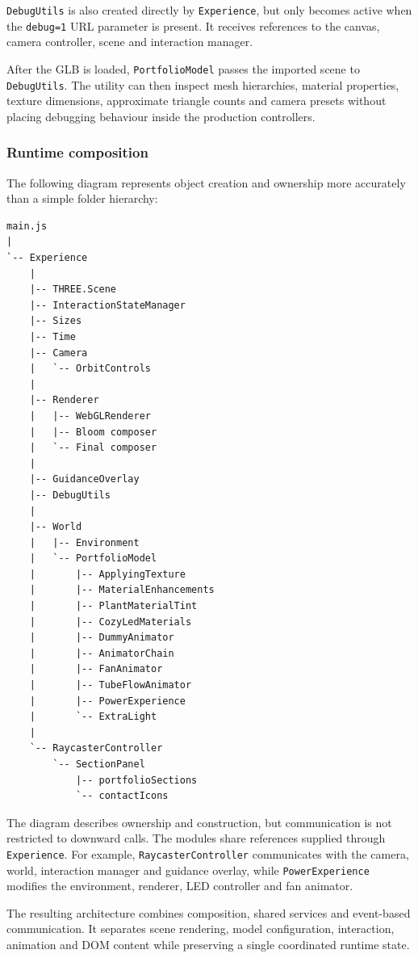 \documentclass{report}
\begin{document}
\texttt{DebugUtils} is also created directly by
\texttt{Experience}, but only becomes active when the
\texttt{debug=1} URL parameter is present. It receives references to
the canvas, camera controller, scene and interaction manager.

After the GLB is loaded, \texttt{PortfolioModel} passes the imported
scene to \texttt{DebugUtils}. The utility can then inspect mesh
hierarchies, material properties, texture dimensions, approximate
triangle counts and camera presets without placing debugging behaviour
inside the production controllers.

\subsubsection{Runtime composition}

The following diagram represents object creation and ownership more
accurately than a simple folder hierarchy:

\begin{verbatim}
main.js
|
`-- Experience
    |
    |-- THREE.Scene
    |-- InteractionStateManager
    |-- Sizes
    |-- Time
    |-- Camera
    |   `-- OrbitControls
    |
    |-- Renderer
    |   |-- WebGLRenderer
    |   |-- Bloom composer
    |   `-- Final composer
    |
    |-- GuidanceOverlay
    |-- DebugUtils
    |
    |-- World
    |   |-- Environment
    |   `-- PortfolioModel
    |       |-- ApplyingTexture
    |       |-- MaterialEnhancements
    |       |-- PlantMaterialTint
    |       |-- CozyLedMaterials
    |       |-- DummyAnimator
    |       |-- AnimatorChain
    |       |-- FanAnimator
    |       |-- TubeFlowAnimator
    |       |-- PowerExperience
    |       `-- ExtraLight
    |
    `-- RaycasterController
        `-- SectionPanel
            |-- portfolioSections
            `-- contactIcons
\end{verbatim}

The diagram describes ownership and construction, but communication is
not restricted to downward calls. The modules share references supplied
through \texttt{Experience}. For example,
\texttt{RaycasterController} communicates with the camera, world,
interaction manager and guidance overlay, while
\texttt{PowerExperience} modifies the environment, renderer, LED
controller and fan animator.

The resulting architecture combines composition, shared services and
event-based communication. It separates scene rendering, model
configuration, interaction, animation and DOM content while preserving
a single coordinated runtime state.
\end{document}
